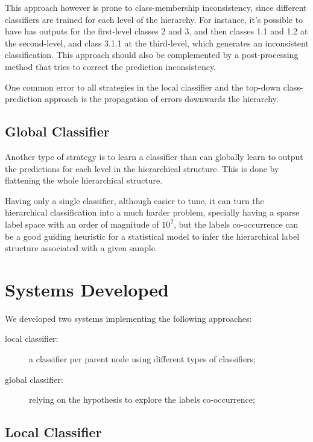 \documentclass[11pt,a4paper]{article}
\begin{document}
This approach however is prone to class-membership inconsistency, since different classifiers are
trained for each level of the hierarchy. For instance, it's possible to have has outputs for the
first-level classes 2 and 3, and then classes 1.1 and 1.2 at the second-level, and class 3.1.1
at the third-level, which generates an inconsistent classification. This approach should also
be complemented by a post-processing method that tries to correct the prediction inconsistency.

One common error to all strategies in the local classifier and the top-down class-prediction
approach is the propagation of errors downwards the hierarchy.



\subsection{Global Classifier}

Another type of strategy is to learn a classifier than can globally learn to
output the predictions for each level in the hierarchical structure. This is
done by flattening the whole hierarchical structure.

Having only a single classifier, although easier to tune, it can turn the
hierarchical classification into a much harder problem, specially having a
sparse label space with an order of magnitude of $10^2$, but the labels co-occurrence
can be a good guiding heuristic for a statistical model to infer the hierarchical
label structure associated with a given sample.

\section{Systems Developed}\label{system}

We developed two systems implementing the following approaches:

\begin{description}
  \item[local classifier:] a classifier per parent node using
  different types of classifiers;
  \item[global classifier:] relying on the hypothesis
  to explore the labels co-occurrence;
\end{description}

\subsection{Local Classifier}
\end{document}
